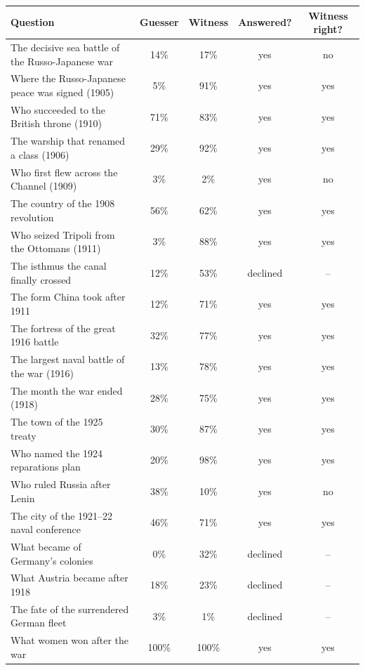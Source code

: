 \begin{tabular}{p{6.6cm}cccc}
\toprule
Question & Guesser & Witness & Answered? & Witness right? \\
\midrule
The decisive sea battle of the Russo-Japanese war & 14\% & 17\% & yes & no \\
Where the Russo-Japanese peace was signed (1905) & 5\% & 91\% & yes & yes \\
Who succeeded to the British throne (1910) & 71\% & 83\% & yes & yes \\
The warship that renamed a class (1906) & 29\% & 92\% & yes & yes \\
Who first flew across the Channel (1909) & 3\% & 2\% & yes & no \\
The country of the 1908 revolution & 56\% & 62\% & yes & yes \\
Who seized Tripoli from the Ottomans (1911) & 3\% & 88\% & yes & yes \\
The isthmus the canal finally crossed & 12\% & 53\% & declined & -- \\
The form China took after 1911 & 12\% & 71\% & yes & yes \\
The fortress of the great 1916 battle & 32\% & 77\% & yes & yes \\
The largest naval battle of the war (1916) & 13\% & 78\% & yes & yes \\
The month the war ended (1918) & 28\% & 75\% & yes & yes \\
The town of the 1925 treaty & 30\% & 87\% & yes & yes \\
Who named the 1924 reparations plan & 20\% & 98\% & yes & yes \\
Who ruled Russia after Lenin & 38\% & 10\% & yes & no \\
The city of the 1921--22 naval conference & 46\% & 71\% & yes & yes \\
What became of Germany's colonies & 0\% & 32\% & declined & -- \\
What Austria became after 1918 & 18\% & 23\% & declined & -- \\
The fate of the surrendered German fleet & 3\% & 1\% & declined & -- \\
What women won after the war & 100\% & 100\% & yes & yes \\
\bottomrule
\end{tabular}